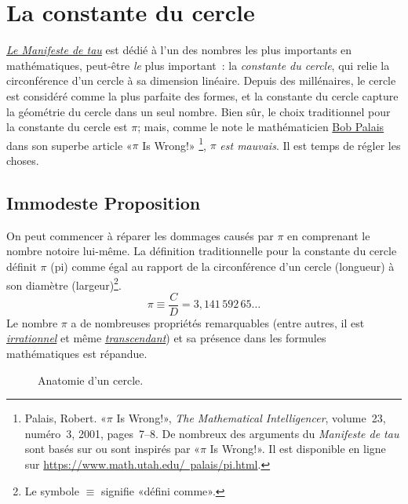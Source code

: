 \section{La constante du cercle} %
\label{sec:the_circle_constant}

\href{https://tauday.com/tau-manifesto}{\emph{Le Manifeste de tau}} est dédié
à l'un des nombres les plus importants en mathématiques, peut-être \emph{le}
plus important~: la \emph{constante du cercle}, qui relie la circonférence d'un
cercle à sa dimension linéaire. Depuis des millénaires, le cercle est considéré
comme la plus parfaite des formes, et la constante du cercle capture la
géométrie du cercle dans un seul nombre. Bien sûr, le choix traditionnel pour la
constante du cercle est $\pi$\ns; mais, comme le note le mathématicien
\href{https://www.math.utah.edu/~palais/}{Bob Palais} dans son superbe article
«\ns $\pi$ Is Wrong!\ns » \footnote{Palais, Robert. «\ns $\pi$ Is Wrong!\ns », \emph{The
Mathematical Intelligencer}, volume~23, numéro~3, 2001, pages~7--8. De nombreux
des arguments du \emph{Manifeste de tau} sont basés sur ou sont inspirés par
«\ns $\pi$ Is Wrong!\ns ». Il est disponible en ligne sur
\href{https://www.math.utah.edu/~palais/pi.html}{https://www.math.utah.edu/~palais/pi.html}.},
$\pi$ \emph{est mauvais}. Il est temps de régler les choses.

  \subsection{Immodeste Proposition} %
  \label{sec:an_immodest_proposal}

On peut commencer à réparer les dommages causés par $\pi$ en comprenant le nombre
notoire lui-même. La définition traditionnelle pour la constante du cercle
définit $\pi$ (pi) comme égal au rapport de la circonférence d'un cercle
(longueur) à son diamètre (largeur)\ns\footnote{Le symbole $\equiv$ signifie
«\ns défini comme\ns ».}.
\begin{equation}
\label{eq:pi}
\pi \equiv \frac{C}{D} = 3{,}141\,592\,65\ldots
\end{equation}
Le nombre $\pi$ a de nombreuses propriétés remarquables (entre autres, il est
\href{https://fr.wikipedia.org/wiki/Nombre_irrationnel}{\emph{irrationnel}} et
même \href{https://fr.wikipedia.org/wiki/Nombre_transcendant}{\emph{transcendant}}) et
sa présence dans les formules mathématiques est répandue.

\begin{figure}
\caption{Anatomie d'un cercle.\label{fig:circle}}
\end{figure}

